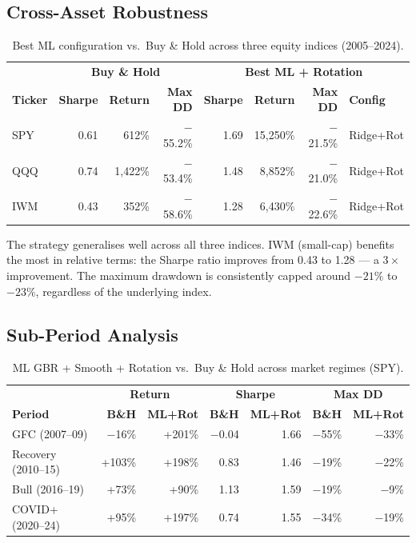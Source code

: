 \documentclass[11pt, a4paper]{article}
\begin{document}
\subsection{Cross-Asset Robustness}

\begin{table}[H]
\centering
\caption{Best ML configuration vs.\ Buy \& Hold across three equity indices (2005--2024).}
\label{tab:crossasset}
\begin{tabular}{l|rrr|rrrl}
\toprule
 & \multicolumn{3}{c|}{\textbf{Buy \& Hold}} & \multicolumn{4}{c}{\textbf{Best ML + Rotation}} \\
\textbf{Ticker} & \textbf{Sharpe} & \textbf{Return} & \textbf{Max DD} & \textbf{Sharpe} & \textbf{Return} & \textbf{Max DD} & \textbf{Config} \\
\midrule
SPY & 0.61 & 612\%    & $-$55.2\% & 1.69 & 15{,}250\% & $-$21.5\% & Ridge+Rot \\
QQQ & 0.74 & 1{,}422\% & $-$53.4\% & 1.48 & 8{,}852\%  & $-$21.0\% & Ridge+Rot \\
IWM & 0.43 & 352\%    & $-$58.6\% & 1.28 & 6{,}430\%  & $-$22.6\% & Ridge+Rot \\
\bottomrule
\end{tabular}
\end{table}

The strategy generalises well across all three indices. IWM (small-cap) benefits the most in relative terms: the Sharpe ratio improves from 0.43 to 1.28 --- a $3\times$ improvement. The maximum drawdown is consistently capped around $-21\%$ to $-23\%$, regardless of the underlying index.

\subsection{Sub-Period Analysis}

\begin{table}[H]
\centering
\caption{ML GBR + Smooth + Rotation vs.\ Buy \& Hold across market regimes (SPY).}
\label{tab:subperiod}
\begin{tabular}{l|rr|rr|rr}
\toprule
 & \multicolumn{2}{c|}{\textbf{Return}} & \multicolumn{2}{c|}{\textbf{Sharpe}} & \multicolumn{2}{c}{\textbf{Max DD}} \\
\textbf{Period} & \textbf{B\&H} & \textbf{ML+Rot} & \textbf{B\&H} & \textbf{ML+Rot} & \textbf{B\&H} & \textbf{ML+Rot} \\
\midrule
GFC (2007--09)       & $-$16\% & +201\% & $-$0.04 & 1.66 & $-$55\% & $-$33\% \\
Recovery (2010--15)  & +103\%  & +198\% & 0.83    & 1.46 & $-$19\% & $-$22\% \\
Bull (2016--19)      & +73\%   & +90\%  & 1.13    & 1.59 & $-$19\% & $-$9\%  \\
COVID+ (2020--24)    & +95\%   & +197\% & 0.74    & 1.55 & $-$34\% & $-$19\% \\
\bottomrule
\end{tabular}
\end{table}
\end{document}
